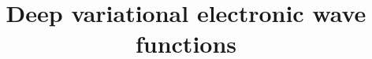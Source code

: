 

\title{Deep variational electronic wave functions}



\twocolumn[{%
  \maketitle
  \vspace{1em}
}]




\begingroup
\setlength\bibsep{0pt}
\renewcommand{\section}[2]{}
\footnotesize

\endgroup


